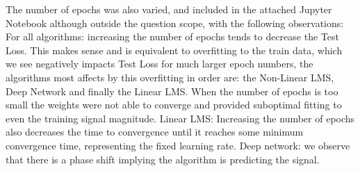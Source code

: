 \documentclass[12pt]{article}
\numberwithin{equation}{section}
\begin{document}
		The number of epochs was also varied, and included in the attached Jupyter Notebook although outside the question scope, with the following observations:\\
		
		For all algorithms: increasing the number of epochs tends to decrease the Test Loss. This makes sense and is equivalent to overfitting to the train data, which we see negatively impacts Test Loss for much larger epoch numbers, the algorithms most affects by this overfitting in order are: the Non-Linear LMS, Deep Network and finally the Linear LMS. When the number of epochs is too small the weights were not able to converge and provided suboptimal fitting to even the training signal magnitude.
		Linear LMS: Increasing the number of epochs also decreases the time to convergence until it reaches some minimum convergence time, representing the fixed learning rate.
		Deep network: we observe that there is a phase shift implying the algorithm is predicting the signal.
\end{document}
